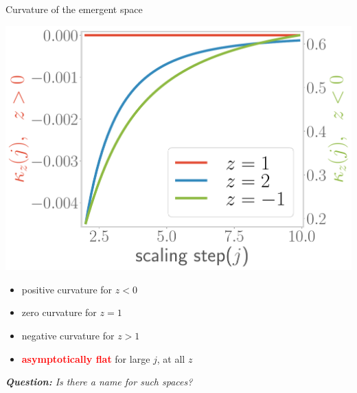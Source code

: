 \documentclass[12pt,aspectratio=169]{beamer}
\newcommand{\focus}[1]{\textcolor{red}{\bf{#1}}}
\begin{document}
\begin{frame}{Curvature of the emergent space}
\begin{minipage}{0.45\textwidth}
	\includegraphics[width=\textwidth]{figures/curvature-pos.pdf}
\end{minipage}
\begin{minipage}{0.5\textwidth}
	\begin{itemize}
		\item positive curvature for \(z < 0\)\\[10pt]
		\item zero curvature for \(z = 1\)\\[10pt]
		\item negative curvature for \(z  > 1\)\\[10pt]
		\item \focus{asymptotically flat} for large \(j\), at all \(z\)
	\end{itemize}
\end{minipage}

\vspace*{\fill}
{\it {\large \bf Question:} Is there a name for such spaces?}
\end{frame}
\end{document}
